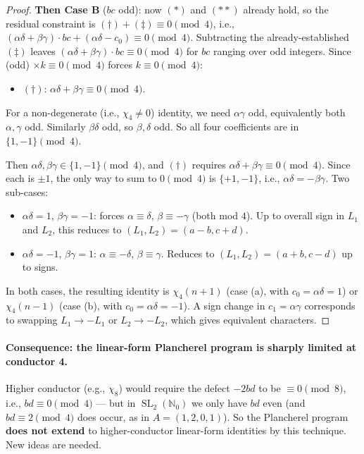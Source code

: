 \documentclass[11pt]{article}
\DeclareMathOperator{\SL}{SL}
\begin{document}
\begin{proof}
\textbf{Then Case B} ($bc$ odd): now $(*)$ and $(**)$ already hold, so the
residual constraint is $(\dagger) + (\ddagger) \equiv 0 \pmod 4$, i.e.,
$(\alpha\delta + \beta\gamma) \cdot bc + (\alpha\delta - c_0) \equiv 0 \pmod 4$.
Subtracting the already-established $(\ddagger)$ leaves
$(\alpha\delta + \beta\gamma) \cdot bc \equiv 0 \pmod 4$ for $bc$ ranging over
odd integers. Since (odd) $\times k \equiv 0 \pmod 4$ forces
$k \equiv 0 \pmod 4$:
\begin{itemize}
\item $(\dagger)$: $\alpha\delta + \beta\gamma \equiv 0 \pmod 4$.
\end{itemize}

For a non-degenerate (i.e., $\chi_4 \ne 0$) identity, we need $\alpha\gamma$
odd, equivalently both $\alpha, \gamma$ odd. Similarly $\beta\delta$ odd, so
$\beta, \delta$ odd. So all four coefficients are in $\{1, -1\} \pmod 4$.

Then $\alpha\delta, \beta\gamma \in \{1, -1\} \pmod 4$, and $(\dagger)$
requires $\alpha\delta + \beta\gamma \equiv 0 \pmod 4$. Since each is $\pm 1$,
the only way to sum to $0 \pmod 4$ is $\{+1, -1\}$, i.e.,
$\alpha\delta = -\beta\gamma$. Two sub-cases:
\begin{itemize}
\item[(a)] $\alpha\delta = 1$, $\beta\gamma = -1$: forces $\alpha \equiv \delta$,
$\beta \equiv -\gamma$ (both mod $4$). Up to overall sign in $L_1$ and $L_2$,
this reduces to $(L_1, L_2) = (a-b, c+d)$.
\item[(b)] $\alpha\delta = -1$, $\beta\gamma = 1$: $\alpha \equiv -\delta$,
$\beta \equiv \gamma$. Reduces to $(L_1, L_2) = (a+b, c-d)$ up to signs.
\end{itemize}
In both cases, the resulting identity is $\chi_4(n+1)$ (case (a), with
$c_0 = \alpha\delta = 1$) or $\chi_4(n-1)$ (case (b), with
$c_0 = \alpha\delta = -1$). A sign change in $c_1 = \alpha\gamma$
corresponds to swapping $L_1 \to -L_1$ or $L_2 \to -L_2$, which gives
equivalent characters.
\end{proof}

\paragraph{Consequence: the linear-form Plancherel program is sharply limited
at conductor 4.}
Higher conductor (e.g., $\chi_8$) would require the defect $-2bd$ to be
$\equiv 0 \pmod 8$, i.e., $bd \equiv 0 \pmod 4$ --- but in $\SL_2(\mathbb{N}_0)$
we only have $bd$ even (and $bd \equiv 2 \pmod 4$ does occur, as in
$A = (1, 2, 0, 1)$). So the Plancherel program \textbf{does not extend} to
higher-conductor linear-form identities by this technique. New ideas are
needed.
\end{document}
